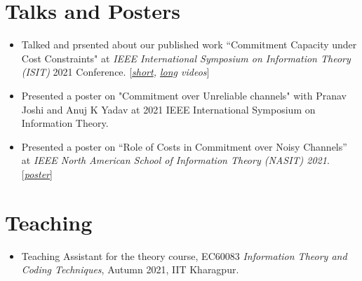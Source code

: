 \documentclass[a4paper,10pt]{article}
\begin{document}
\section{Talks and Posters}
\begin{itemize}
	\item Talked and prsented about our published work ``Commitment Capacity under Cost Constraints" at \textit{IEEE International Symposium on Information Theory (ISIT)} 2021 Conference. [\textit{\href{https://drive.google.com/file/d/1wa_nDtqyEUFPBMkJChlZAyT96lmBZcB5/view?usp=sharing}{short}, \href{https://drive.google.com/file/d/1hgJ9LcpQ_dybLoeyZEmrDeuTUJVGlrOR/view?usp=sharing}{long} videos}]
	
	\item Presented a poster on "Commitment over Unreliable channels" with Pranav Joshi and Anuj K Yadav at 2021 IEEE International Symposium on Information Theory.
	
	\item Presented a poster on ``Role of Costs in Commitment over Noisy Channels'' at \textit{IEEE North American School of Information Theory (NASIT) 2021}. [\textit{\href{https://drive.google.com/file/d/1--6cyQ98YNENRDTdBlBZsV1YmH0Fi6Ve/view?usp=sharing}{\textit{poster}}}]
\end{itemize}


\section{Teaching}
\small
\begin{itemize}
	\item Teaching Assistant for the theory course, EC60083 \textit{Information Theory and Coding Techniques}, Autumn 2021, IIT Kharagpur.
\end{itemize}
\end{document}
